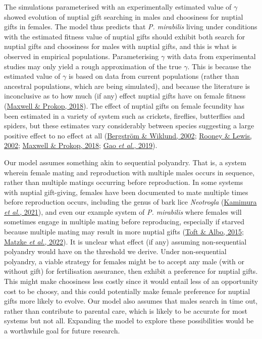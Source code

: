 \documentclass[
]{article}
\begin{document}
The simulations parameterised with an experimentally estimated value of
\(\gamma\) showed evolution of nuptial gift searching in males and
choosiness for nuptial gifts in females. The model thus predicts that
\emph{P. mirabilis} living under conditions with the estimated fitness
value of nuptial gifts should exhibit both search for nuptial gifts and
choosiness for males with nuptial gifts, and this is what is observed in
empirical populations. Parameterising \(\gamma\) with data from
experimental studies may only yield a rough approximation of the true
\(\gamma\). This is because the estimated value of \(\gamma\) is based
on data from current populations (rather than ancestral populations,
which are being simulated), and because the literature is inconclusive
as to how much (if any) effect nuptial gifts have on female fitness
(\protect\hyperlink{ref-Maxwell2018}{Maxwell \& Prokop, 2018}). The
effect of nuptial gifts on female fecundity has been estimated in a
variety of system such as crickets, fireflies, butterflies and spiders,
but these estimates vary considerably between species suggesting a large
positive effect to no effect at all
(\protect\hyperlink{ref-Bergstrom2002}{Bergström \& Wiklund, 2002};
\protect\hyperlink{ref-Rooney2002}{Rooney \& Lewis, 2002};
\protect\hyperlink{ref-Maxwell2018}{Maxwell \& Prokop, 2018};
\protect\hyperlink{ref-Gao2019}{Gao \emph{et al.}, 2019}).

Our model assumes something akin to sequential polyandry. That is, a
system wherein female mating and reproduction with multiple males occurs
in sequence, rather than multiple matings occurring before reproduction.
In some systems with nuptial gift-giving, females have been documented
to mate multiple times before reproduction occurs, including the genus
of bark lice \emph{Neotrogla}
(\protect\hyperlink{ref-Kamimura2021}{Kamimura \emph{et al.}, 2021}),
and even our example system of \emph{P. mirabilis} where females will
sometimes engage in multiple mating before reproducing, especially if
starved because multiple mating may result in more nuptial gifts
(\protect\hyperlink{ref-Toft2015}{Toft \& Albo, 2015};
\protect\hyperlink{ref-Matzke2022}{Matzke \emph{et al.}, 2022}). It is
unclear what effect (if any) assuming non-sequential polyandry would
have on the threshold we derive. Under non-sequential polyandry, a
viable strategy for females might be to accept any male (with or without
gift) for fertilisation assurance, then exhibit a preference for nuptial
gifts. This might make choosiness less costly since it would entail less
of an opportunity cost to be choosy, and this could potentially make
female preference for nuptial gifts more likely to evolve. Our model
also assumes that males search in time out, rather than contribute to
parental care, which is likely to be accurate for most systems but not
all. Expanding the model to explore these possibilities would be a
worthwhile goal for future research.
\end{document}
